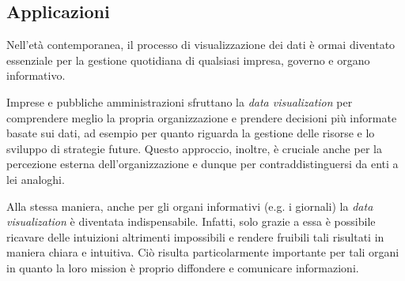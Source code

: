 \subsection{Applicazioni}
Nell'età contemporanea, il processo di visualizzazione dei dati è ormai diventato essenziale per la gestione quotidiana di qualsiasi 
impresa, governo e organo informativo.

Imprese e pubbliche amministrazioni sfruttano la \emph{data visualization} per comprendere meglio la propria organizzazione e 
prendere decisioni più informate basate sui dati, ad esempio per quanto riguarda la gestione delle risorse e lo sviluppo di strategie future. 
Questo approccio, inoltre, è cruciale anche per la percezione esterna dell'organizzazione e dunque per contraddistinguersi da enti a lei analoghi.

Alla stessa maniera, anche per gli organi informativi (e.g. i giornali) la \emph{data visualization} è diventata indispensabile. 
Infatti, solo grazie a essa è possibile ricavare delle intuizioni altrimenti impossibili e rendere fruibili 
tali risultati in maniera chiara e intuitiva. Ciò risulta particolarmente importante per tali organi in quanto la loro mission è proprio diffondere 
e comunicare informazioni.

